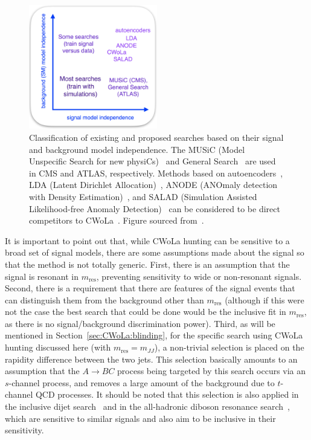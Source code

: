 \begin{figure}
\centering
\includegraphics[width=0.5\textwidth]{figures_CWoLa/ANODE.png}
\caption{
  Classification of existing and proposed searches based on their signal and background model independence.
  The MUSiC (Model Unspecific Search for new physiCs)~\cite{CMS:2011fra,CMS:2017yoc} and General Search~\cite{ATLAS-CONF-2012-107,ATLAS-CONF-2014-006,Aaboud:2018ufy} are used in CMS and ATLAS, respectively.
  Methods based on autoencoders~\cite{Farina:2018fyg,Heimel:2018mkt,Roy:2019jae,Cerri:2018anq,Blance:2019ibf,Hajer:2018kqm}, LDA (Latent Dirichlet Allocation)~\cite{Dillon:2019cqt}, ANODE (ANOmaly detection with Density Estimation)~\cite{Nachman:2020lpy}, and SALAD (Simulation Assisted Likelihood-free Anomaly Detection)~\cite{Andreassen:2020nkr} can be considered to be direct competitors to CWoLa~\cite{Metodiev:2017vrx,Collins:2018epr,Collins:2019jip}.
  Figure sourced from~\cite{Nachman:2020lpy}.
}
\label{fig:CWoLa:ANODE}
\end{figure}

It is important to point out that, while CWoLa hunting can be sensitive to a broad set of signal models, there are some assumptions made about the signal so that the method is not totally generic.
First, there is an assumption that the signal is resonant in $m_\text{res}$, preventing sensitivity to wide or non-resonant signals.
Second, there is a requirement that there are features of the signal events that can distinguish them from the background other than $m_\text{res}$ (although if this were not the case the best search that could be done would be the inclusive fit in $m_\text{res}$, as there is no signal/background discrimination power).
Third, as will be mentioned in Section~\ref{sec:CWoLa:blinding}, for the specific search using CWoLa hunting discussed here (with $m_\text{res}=m_{JJ}$), a non-trivial selection is placed on the rapidity difference between the two jets.
This selection basically amounts to an assumption that the $A\rightarrow BC$ process being targeted by this search occurs via an $s$-channel process, and removes a large amount of the background due to $t$-channel QCD processes.
It should be noted that this selection is also applied in the inclusive dijet search~\cite{Aad:2019hjw} and in the all-hadronic diboson resonance search~\cite{Aad:2019fbh}, which are sensitive to similar signals and also aim to be inclusive in their sensitivity.

